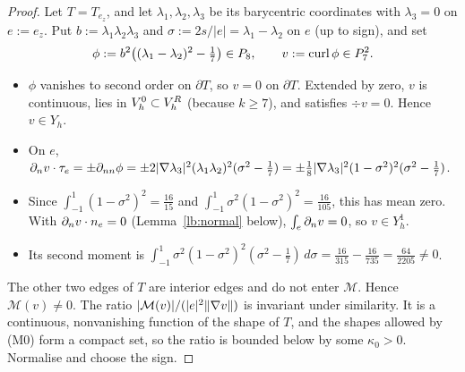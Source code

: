 \begin{proof}
Let $T=T_{e_z}$, and let $\lambda_1,\lambda_2,\lambda_3$ be its barycentric coordinates with $\lambda_3=0$ on $e:=e_z$. Put $b:=\lambda_1\lambda_2\lambda_3$ and $\sigma:=2s/|e|=\lambda_1-\lambda_2$ on $e$ (up to sign), and set
\[
\phi:=b^2\bigl((\lambda_1-\lambda_2)^2-\tfrac17\bigr)\in P_8,\qquad v:=\operatorname{curl}\phi\in P_7^2 .
\]
\begin{itemize}
\item $\phi$ vanishes to second order on $\partial T$, so $v=0$ on $\partial T$. Extended by zero, $v$ is continuous, lies in $V_h^0\subset V_h^R$ (because $k\ge7$), and satisfies $\div v=0$. Hence $v\in Y_h$.
\item On $e$, $\partial_n v\cdot\tau_e=\pm\partial_{nn}\phi=\pm2|\nabla\lambda_3|^2(\lambda_1\lambda_2)^2(\sigma^2-\tfrac17)=\pm\tfrac18|\nabla\lambda_3|^2(1-\sigma^2)^2(\sigma^2-\tfrac17)$.
\item Since $\int_{-1}^1(1-\sigma^2)^2=\frac{16}{15}$ and $\int_{-1}^1\sigma^2(1-\sigma^2)^2=\frac{16}{105}$, this has mean zero. With $\partial_n v\cdot n_e=0$ (Lemma~\ref{lb:normal} below), $\int_e\partial_n v=0$, so $v\in Y_h^1$.
\item Its second moment is $\int_{-1}^1\sigma^2(1-\sigma^2)^2(\sigma^2-\frac17)\,d\sigma=\frac{16}{315}-\frac{16}{735}=\frac{64}{2205}\neq0$.
\end{itemize}
The other two edges of $T$ are interior edges and do not enter $\mathcal M$. Hence $\mathcal M(v)\ne0$. The ratio $|\mathcal M(v)|/(|e|^2\lVert \nabla v\rVert)$ is invariant under similarity. It is a continuous, nonvanishing function of the shape of $T$, and the shapes allowed by (M0) form a compact set, so the ratio is bounded below by some $\kappa_0>0$. Normalise and choose the sign.
\end{proof}

